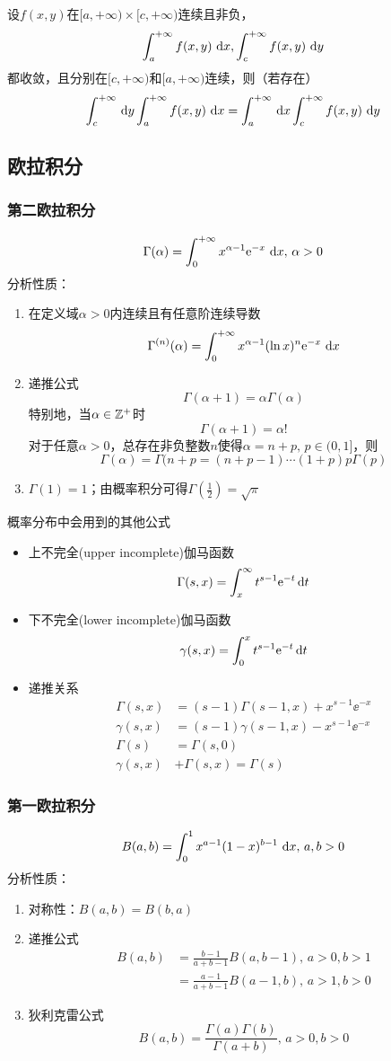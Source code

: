 \begin{theorem}
设$f(x,y)$在$[a,+\infty)\times[c,+\infty)$连续且非负，
\[\displaystyle\int_{a}^{+\infty}{f(x,y)}\,\,\mathrm{d} x,\displaystyle\int_{c}^{+\infty}{f(x,y)}\,\,\mathrm{d} y\]
都收敛，且分别在$[c,+\infty)$和$[a,+\infty)$连续，则（若存在）
\[\int_c^{+\infty}\,\mathrm{d} y\displaystyle\int_{a}^{+\infty}{f(x,y)}\,\,\mathrm{d} x=\int_a^{+\infty}\,\mathrm{d} x\displaystyle\int_{c}^{+\infty}{f(x,y)}\,\,\mathrm{d} y\]
\end{theorem}

\subsection{欧拉积分}
\subsubsection{第二欧拉积分}
\[\Gamma(\alpha)=\displaystyle\int_{0}^{+\infty}{x^{\alpha-1}\mathrm{e}^{-x}}\,\,\mathrm{d} x,\,\alpha>0\]
分析性质：
\begin{enumerate}
	\item 在定义域$\alpha>0$内连续且有任意阶连续导数
	\[\Gamma^{(n)}(\alpha)=\displaystyle\int_{0}^{+\infty}{x^{\alpha-1}(\ln x)^n\mathrm{e}^{-x}}\,\,\mathrm{d} x\]
	\item 递推公式
	\[\Gamma(\alpha+1)=\alpha\Gamma(\alpha)\]
	特别地，当$\alpha\in\mathbb{Z}^+$时
	\[\Gamma(\alpha+1)=\alpha!\]
	对于任意$\alpha>0$，总存在非负整数$n$使得$\alpha=n+p,\,p\in(0,1]$，则
	\[\Gamma(\alpha)=\Gamma(n+p=(n+p-1)\cdots(1+p)p\Gamma(p)\]
	\item $\Gamma(1)=1$；由概率积分可得$\Gamma(\frac{1}{2})=\sqrt{\pi}$
\end{enumerate}
概率分布中会用到的其他公式
\begin{itemize}
\item 上不完全(upper incomplete)伽马函数
\[ \Gamma(s,x) = \int_x^{\infty} t^{s-1}\mathrm{e}^{-t}\,\mathrm{d} t\]
\item 下不完全(lower incomplete)伽马函数
\[ \gamma(s,x) = \int_{0}^{x}t^{s-1}\mathrm{e}^{-t}\,\mathrm{d} t\]
\item 递推关系
\[\begin{aligned}
\Gamma(s,x)&=(s-1)\Gamma(s-1,x) + x^{s-1} \ee^{-x}\\
\gamma(s,x)&=(s-1)\gamma(s-1,x) - x^{s-1} \ee^{-x}\\
\Gamma(s) &= \Gamma(s,0)\\
\gamma (s,x)&+\Gamma (s,x)=\Gamma (s)
\end{aligned}\]
\end{itemize}

\subsubsection{第一欧拉积分}
\[B(a,b)=\displaystyle\int_{0}^{1}{x^{a-1}(1-x)^{b-1}}\,\,\mathrm{d} x,\,a,b>0\]
分析性质：
\begin{enumerate}
	\item 对称性：$B(a,b)=B(b,a)$
	\item 递推公式
	\[\begin{aligned}
	B(a,b)&=\frac{b-1}{a+b-1}B(a,b-1),\,a>0,b>1\\
	&=\frac{a-1}{a+b-1}B(a-1,b),\,a>1,b>0
	\end{aligned}\]
	\item 狄利克雷公式
	\[B(a,b)=\frac{\Gamma(a)\Gamma(b)}{\Gamma(a+b)},\,a>0,b>0\]
\end{enumerate}